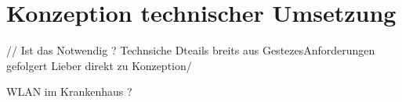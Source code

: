 \chapter{Konzeption technischer Umsetzung}\label{chapter:tanforderungen}

// Ist das Notwendig ?
Technsiche Dteails breits aus GestezesAnforderungen gefolgert 
Lieber direkt zu Konzeption/

WLAN im Krankenhaus ?
